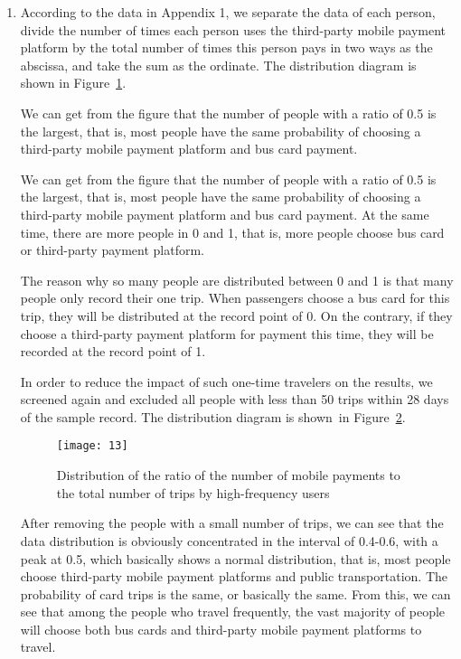 \documentclass[../mcmpaper]{subfiles}
\begin{document}
\begin{enumerate}[label=\arabic*., format=\bfseries, itemindent=0pt, leftmargin=0pt, topsep=0pt, listparindent=\parindent, itemsep=1pt]
\begin{figure}[!ht]
    \label{fig:5.8}
\end{figure}
    \item According to the data in Appendix 1, we separate the data of each person, divide the number of times each person uses the third-party mobile payment platform by the total number of times this person pays in two ways as the abscissa, and take the sum as the ordinate. The distribution diagram is shown in Figure~\ref{fig:5.8}.
\par
We can get from the figure that the number of people with a ratio of 0.5 is the largest, that is, most people have the same probability of choosing a third-party mobile payment platform and bus card payment.
\par
We can get from the figure that the number of people with a ratio of 0.5 is the largest, that is, most people have the same probability of choosing a third-party mobile payment platform and bus card payment. At the same time, there are more people in 0 and 1, that is, more people choose bus card or third-party payment platform.
\par
The reason why so many people are distributed between 0 and 1 is that many people only record their one trip. When passengers choose a bus card for this trip, they will be distributed at the record point of 0. On the contrary, if they choose a third-party payment platform for payment this time, they will be recorded at the record point of 1.
\par
In order to reduce the impact of such one-time travelers on the results, we screened again and excluded all people with less than 50 trips within 28 days of the sample record. The distribution diagram is shown~in Figure~\ref{fig:5.9}.
\par
\begin{figure}[tp]
    \centering
    \texttt{[image: 13]}
    \caption{Distribution of the ratio of the number of mobile payments to the total number of trips by high-frequency users}
    \label{fig:5.9}
\end{figure}
After removing the people with a small number of trips, we can see that the data distribution is obviously concentrated in the interval of 0.4-0.6, with a peak at 0.5, which basically shows a normal distribution, that is, most people choose third-party mobile payment platforms and public transportation. The probability of card trips is the same, or basically the same. From this, we can see that among the people who travel frequently, the vast majority of people will choose both bus cards and third-party mobile payment platforms to travel.

\end{enumerate}
\end{document}
